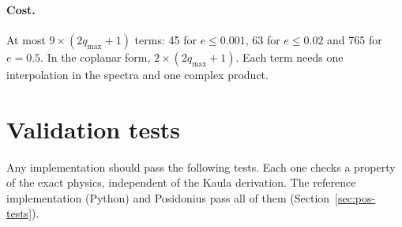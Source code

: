 \paragraph{Cost.} At most $9\times(2q_{\max}+1)$ terms: 45 for $e\le0.001$, 63 for $e\le0.02$ and 765 for $e=0.5$. In the coplanar form, $2\times(2q_{\max}+1)$. Each term needs one interpolation in the spectra and one complex product.

\section{Validation tests}\label{sec:validation}
Any implementation should pass the following tests. Each one checks a property of the exact physics, independent of the Kaula derivation. The reference implementation (Python) and Posidonius pass all of them (Section~\ref{sec:pos-tests}).
